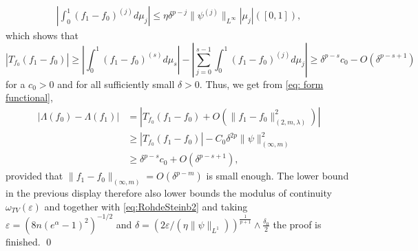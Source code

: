 \documentclass[preprint]{imsart}
\newcommand{\eps}{\varepsilon}
\numberwithin{equation}{section}
\begin{document}
\begin{appendix}
\begin{align*}
    \left|\int_0^1 (f_1-f_0)^{(j)}d\mu_{j}\right| \le \eta\delta^{p-j} \|\psi^{(j)}\|_{L^\infty}|\mu_{j}|([0,1]),
\end{align*} 
which shows that 
$$
|T_{f_0}(f_1-f_0)| \ge \left|\int_0^1 (f_1-f_0)^{(s)}d\mu_{s}\right| - \left| \sum_{j=0}^{s-1}\int_0^1 (f_1-f_0)^{(j)}d\mu_{j} \right|
\ge
\delta^{p-s}c_0 - O(\delta^{p-s+1})
$$ 
for a $c_0>0$ and for all sufficiently small $\delta>0$.
Thus, we get from \eqref{eq: form functional},
\begin{align*}
    |\Lambda(f_0)-\Lambda(f_1)| 
    &= |T_{f_0}(f_1-f_0) + O(\|f_1-f_0\|^2_{(2,m,\lambda)})|\\
    &\ge |T_{f_0}(f_1-f_0)| - C_0\delta^{2p}\|\psi\|^2_{(\infty,m)} \\
    &\ge \delta^{p-s}c_0 + O(\delta^{p-s+1}),
\end{align*}
provided that $\|f_1-f_0\|_{(\infty,m)} = O(\delta^{p-m})$ is small enough. The lower bound in the previous display therefore also lower bounds the modulus of continuity $\omega_{TV}(\eps)$ and together with \eqref{eq:RohdeSteinb2} and taking $\eps= (8n(e^\alpha-1)^2)^{-1/2}$ and $\delta=(2\eps/(\eta\|\psi\|_{L^1}))^{\frac{1}{p+1}}\land \frac{\delta_0}{2}$ the proof is finished.
\hfill\qed



\end{appendix}
\end{document}
